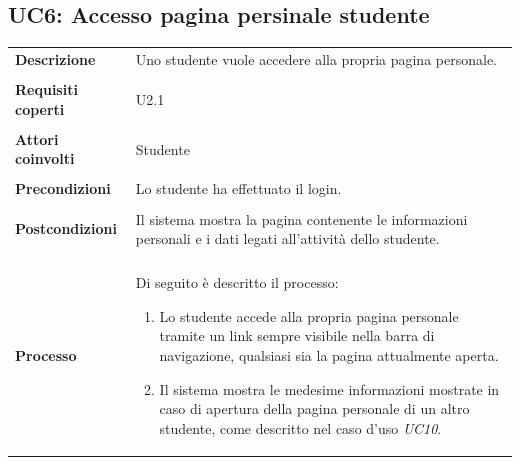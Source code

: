 \documentclass[10pt,a4paper]{report}
\begin{document}
	\subsection{UC6: Accesso pagina persinale studente}
	\begin{tabular}{lp{}}
		\textbf{Descrizione}&Uno studente vuole accedere alla propria pagina personale.\\
		\\
		\textbf{Requisiti coperti}&U2.1\\
		\\
		\textbf{Attori coinvolti}&Studente\\
		\\
		\textbf{Precondizioni}&Lo studente ha effettuato il login.\\
		\\
		\textbf{Postcondizioni}&Il sistema mostra la pagina contenente le informazioni personali e i dati legati all'attività dello studente.\\
		\\
		\textbf{Processo}&Di seguito è descritto il processo:
		\begin{enumerate}
			\item Lo studente accede alla propria pagina personale tramite un link sempre visibile nella barra di navigazione, qualsiasi sia la pagina attualmente aperta.
			\item Il sistema mostra le medesime informazioni mostrate in caso di apertura della pagina personale di un altro studente, come descritto nel caso d'uso \textit{UC10}.
		\end{enumerate}
	\end{tabular}
\end{document}

